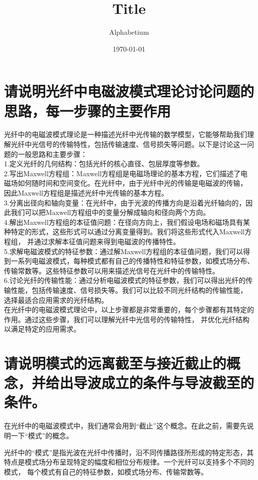 \documentclass[12pt, a4paper, oneside]{article}
\title{Title}
\date{\today}
\author{Alphabetium}
\begin{document}
\begin{spacing}{2.0}
\maketitle


\section{请说明光纤中电磁波模式理论讨论问题的思路，每一步骤的主要作用}
光纤中的电磁波模式理论是一种描述光纤中光传输的数学模型，它能够帮助我们理解光纤中光信号的传输特性，包括传输速度、信号损失等问题。以下是讨论这一问题的一般思路和主要步骤：
\\ 
1.定义光纤的几何结构：包括光纤的核心直径、包层厚度等参数。
\\
2.写出Maxwell方程组：Maxwell方程组是电磁场理论的基本方程，它们描述了电磁场如何随时间和空间变化。在光纤中，由于光纤中光的传输是电磁波的传输，
因此Maxwell方程组是描述光纤中光传输的基本方程。
\\
3.分离出径向和轴向变量：在光纤中，由于光波的传播方向是沿着光纤轴向的，因此我们可以把Maxwell方程组中的变量分解成轴向和径向两个方向。
\\
4.解出Maxwell方程组的本征值问题：在径向方向上，我们假设电场和磁场具有某种特定的形式，这些形式可以通过分离变量得到。我们将这些形式代入Maxwell方程组，
并通过求解本征值问题来得到电磁波的传播特性。
\\
5.求解电磁波模式的特征参数：通过解Maxwell方程组的本征值问题，我们可以得到一系列电磁波模式，每种模式都有自己的传播特性和特征参数，如模式场分布、
传输常数等。这些特征参数可以用来描述光信号在光纤中的传输特性。
\\
6.讨论光纤的传输性能：通过分析电磁波模式的特征参数，我们可以得出光纤的传输性能，包括传输速度、信号损失等。我们可以比较不同光纤结构的传输性能，
选择最适合应用需求的光纤结构。
\\
在光纤中的电磁波模式理论中，以上步骤都是非常重要的，每个步骤都有其特定的作用。通过这些步骤，我们可以理解光纤中光信号的传输特性，
并优化光纤结构以满足特定的应用需求。

\section{请说明模式的远离截至与接近截止的概念，并给出导波成立的条件与导波截至的条件。}
在光纤中的电磁波模式中，我们通常会用到“截止”这个概念。在此之前，需要先说明一下“模式”的概念。

光纤中的“模式”是指光波在光纤中传播时，沿不同传播路径所形成的特定形态，其特点是模式场分布呈现特定的幅度和相位分布规律。一个光纤可以支持多个不同的模式，
每个模式有自己的特征参数，如模式场分布、传输常数等。


\end{spacing}
\end{document}
